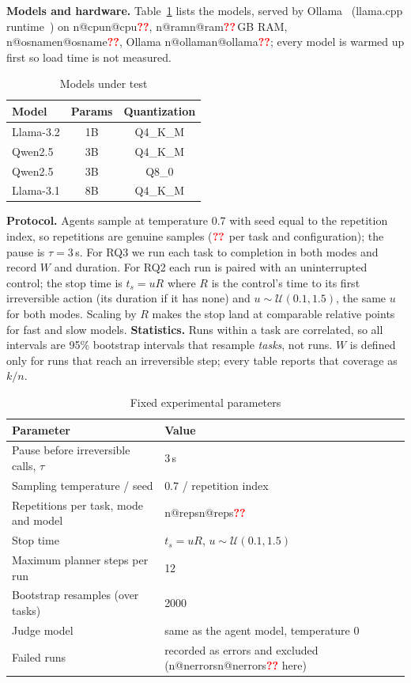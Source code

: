 \documentclass[conference]{IEEEtran}
\makeatletter
\newcommand{\pend}{\textcolor{red}{\textbf{??}}}
\newcommand{\num}[1]{\ifcsname n@#1\endcsname\csname n@#1\endcsname\else\pend\fi}
\makeatother
\begin{document}
\textbf{Models and hardware.} Table~\ref{tab:models} lists the models, served by Ollama~\cite{ollama} (llama.cpp runtime~\cite{llamacpp}) on \num{cpu}, \num{ram}\,GB RAM, \num{osname}, Ollama \num{ollama}; every model is warmed up first so load time is not measured.
\begin{table}[t]\centering\caption{Models under test}\label{tab:models}\small
\begin{tabular}{lcc}\toprule Model & Params & Quantization\\\midrule
Llama-3.2 & 1B & Q4\_K\_M\\ Qwen2.5 & 3B & Q4\_K\_M\\ Qwen2.5 & 3B & Q8\_0\\ Llama-3.1 & 8B & Q4\_K\_M\\\bottomrule\end{tabular}
\end{table}

\textbf{Protocol.} Agents sample at temperature 0.7 with seed equal to the repetition index, so repetitions are genuine samples ($\num{reps}$ per task and configuration); the pause is $\tau=3$\,s. For RQ3 we run each task to completion in both modes and record $W$ and duration. For RQ2 each run is paired with an uninterrupted control; the stop time is $t_s=uR$ where $R$ is the control's time to its first irreversible action (its duration if it has none) and $u\sim\mathcal{U}(0.1,1.5)$, the same $u$ for both modes. Scaling by $R$ makes the stop land at comparable relative points for fast and slow models. \textbf{Statistics.} Runs within a task are correlated, so all intervals are 95\% bootstrap intervals that resample \emph{tasks}, not runs. $W$ is defined only for runs that reach an irreversible step; every table reports that coverage as $k/n$.

\begin{table}[t]\centering\caption{Fixed experimental parameters}\label{tab:params}\footnotesize
\begin{tabular}{ll}\toprule Parameter & Value\\\midrule
Pause before irreversible calls, $\tau$ & 3\,s\\
Sampling temperature / seed & 0.7 / repetition index\\
Repetitions per task, mode and model & \num{reps}\\
Stop time & $t_s=uR$, $u\sim\mathcal{U}(0.1,1.5)$\\
Maximum planner steps per run & 12\\
Bootstrap resamples (over tasks) & 2000\\
Judge model & same as the agent model, temperature 0\\
Failed runs & recorded as errors and excluded (\num{nerrors} here)\\\bottomrule\end{tabular}
\end{table}
\end{document}
